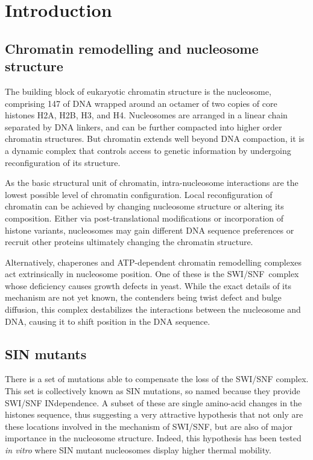 \section{Introduction}

  \subsection{Chromatin remodelling and nucleosome structure}

    The building block of eukaryotic chromatin structure is the nucleosome, comprising
    \SI{147}{\bp} of DNA wrapped around an octamer of two copies of core histones H2A,
    H2B, H3, and H4. Nucleosomes are arranged in a linear chain separated by DNA linkers, and
    can be further compacted into higher order chromatin structures. But chromatin extends
    well beyond DNA compaction, it is a dynamic complex that controls access to genetic
    information by undergoing reconfiguration of its structure.

    As the basic structural unit of chromatin, intra-nucleosome interactions
    are the lowest possible level of chromatin configuration. Local reconfiguration
    of chromatin can be achieved by changing nucleosome structure or altering
    its composition. Either via post-translational modifications or incorporation
    of histone variants, nucleosomes may gain different DNA sequence preferences
    or recruit other proteins ultimately changing the chromatin structure.

    Alternatively, chaperones and ATP-dependent chromatin remodelling complexes
    act extrinsically in nucleosome position. One of these is the SWI/SNF~complex
    whose deficiency causes growth defects in yeast. While the exact details of
    its mechanism are not yet known, the contenders being twist defect and
    bulge diffusion, this complex destabilizes the interactions between the
    nucleosome and DNA, causing it to shift position in the DNA sequence.

  \subsection{SIN mutants}

    There is a set of mutations able to compensate the loss of the SWI/SNF
    complex. This set is collectively known as SIN mutations, so named because
    they provide SWI/SNF INdependence. A subset of these are single
    amino-acid changes in the histones sequence, thus suggesting a very
    attractive hypothesis that not only are these locations involved in the
    mechanism of SWI/SNF, but are also of major importance in the nucleosome
    structure. Indeed, this hypothesis has been tested \textit{in vitro}
    where SIN mutant nucleosomes display higher thermal mobility.

